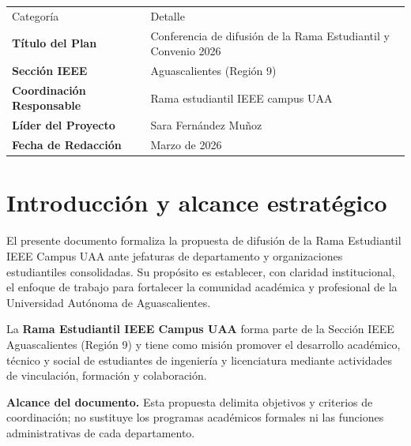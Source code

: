 \documentclass[11pt,a4paper]{article}
\begin{document}
\begin{center}
\begin{tabular}{@{}p{4.5cm} p{8cm}@{}}
    \small Categoría & \small Detalle \\[0.5cm]
    
    \textbf{Título del Plan} & Conferencia de difusión de la Rama Estudiantil y Convenio 2026 \\[0.5cm]
    
    \textbf{Sección IEEE} & Aguascalientes (Región 9) \\[0.5cm]
    
    \textbf{Coordinación Responsable} & Rama estudiantil IEEE campus UAA \\[0.5cm]
    
    \textbf{Líder del Proyecto} & Sara Fernández Muñoz\\[0.5cm]
    
    \textbf{Fecha de Redacción} & Marzo de 2026 \\[0.5cm]
    
\end{tabular}
\end{center}


\pagestyle{fancy}
\fancyhf{}
\renewcommand{\headrulewidth}{0pt}
\fancyfoot[C]{\thepage}

\vspace{0.5cm}

\section{Introducción y alcance estratégico}

El presente documento formaliza la propuesta de difusión de la Rama Estudiantil IEEE Campus UAA ante jefaturas de departamento y organizaciones estudiantiles consolidadas. Su propósito es establecer, con claridad institucional, el enfoque de trabajo para fortalecer la comunidad académica y profesional de la Universidad Autónoma de Aguascalientes.

La \textbf{Rama Estudiantil IEEE Campus UAA} forma parte de la Sección IEEE Aguascalientes (Región 9) y tiene como misión promover el desarrollo académico, técnico y social de estudiantes de ingeniería y licenciatura mediante actividades de vinculación, formación y colaboración.

\textbf{Alcance del documento.} Esta propuesta delimita objetivos y criterios de coordinación; no sustituye los programas académicos formales ni las funciones administrativas de cada departamento.
\end{document}
